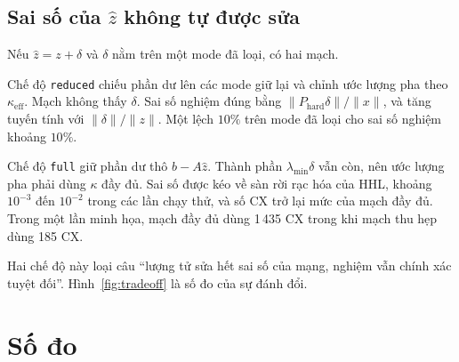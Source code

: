 \documentclass[11pt,a4paper]{article}
\newcommand{\rev}[1]{{\color{revised}#1}}
\newenvironment{revisedblock}{\par\color{revised}\ignorespaces}{\par}
\begin{document}
\subsection{\rev{Sai số của \(\hat z\) không tự được sửa}}

\begin{revisedblock}
Nếu \(\hat z=z+\delta\) và \(\delta\) nằm trên một mode đã loại, có hai mạch.

Chế độ \texttt{reduced} chiếu phần dư lên các mode giữ lại và chỉnh ước lượng pha theo \(\kappa_{\mathrm{eff}}\).
Mạch không thấy \(\delta\).
Sai số nghiệm đúng bằng \(\lVert P_{\mathrm{hard}}\delta\rVert/\lVert x\rVert\), và tăng tuyến tính với \(\lVert\delta\rVert/\lVert z\rVert\).
Một lệch \(10\%\) trên mode đã loại cho sai số nghiệm khoảng \(10\%\).

Chế độ \texttt{full} giữ phần dư thô \(b-A\hat z\).
Thành phần \(\lambda_{\min}\delta\) vẫn còn, nên ước lượng pha phải dùng \(\kappa\) đầy đủ.
Sai số được kéo về sàn rời rạc hóa của HHL, khoảng \(10^{-3}\) đến \(10^{-2}\) trong các lần chạy thử, và số CX trở lại mức của mạch đầy đủ.
Trong một lần minh họa, mạch đầy đủ dùng 1\,435 CX trong khi mạch thu hẹp dùng 185 CX.

Hai chế độ này loại câu ``lượng tử sửa hết sai số của mạng, nghiệm vẫn chính xác tuyệt đối''.
Hình~\ref{fig:tradeoff} là số đo của sự đánh đổi.
\end{revisedblock}

\section{\rev{Số đo}}
\label{sec:results}
\end{document}
